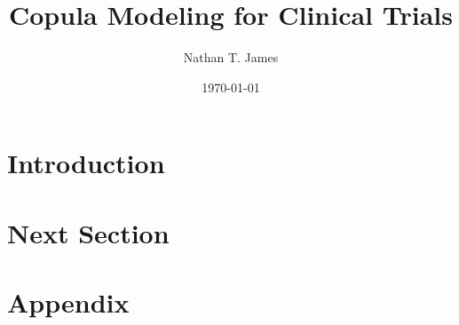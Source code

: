 \documentclass[11pt]{article}
\title{Copula Modeling for Clinical Trials}
\author{Nathan T. James}
\date{\today}
\begin{document}
	
\maketitle

\section{Introduction}\label{sec1}


\section{Next Section}\label{sec2}


   

\newpage
\section*{Appendix}\label{append}
  
\end{document}
